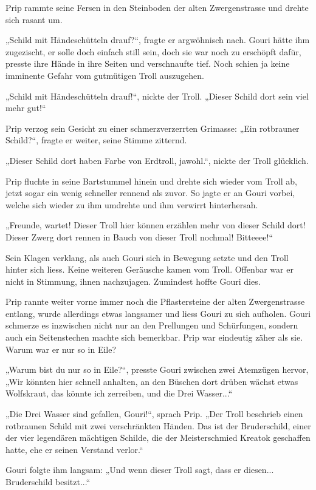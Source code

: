 Prip rammte seine Fersen in den Steinboden der alten Zwergenstrasse und drehte sich rasant um.

„Schild mit Händeschütteln drauf?“, fragte er argwöhnisch nach. Gouri hätte ihm zugezischt, er solle doch einfach still sein, doch sie war noch zu erschöpft dafür, presste ihre Hände in ihre Seiten und verschnaufte tief. Noch schien ja keine imminente Gefahr vom gutmütigen Troll auszugehen.

„Schild mit Händeschütteln drauf!“, nickte der Troll. „Dieser Schild dort sein viel mehr gut!“

Prip verzog sein Gesicht zu einer schmerzverzerrten Grimasse: „Ein rotbrauner Schild?“, fragte er weiter, seine Stimme zitternd.

„Dieser Schild dort haben Farbe von Erdtroll, jawohl.“, nickte der Troll glücklich.

Prip fluchte in seine Bartstummel hinein und drehte sich wieder vom Troll ab, jetzt sogar ein wenig schneller rennend als zuvor. So jagte er an Gouri vorbei, welche sich wieder zu ihm umdrehte und ihm verwirrt hinterhersah.

„Freunde, wartet! Dieser Troll hier können erzählen mehr von dieser Schild dort! Dieser Zwerg dort rennen in Bauch von dieser Troll nochmal! Bitteeee!“

Sein Klagen verklang, als auch Gouri sich in Bewegung setzte und den Troll hinter sich liess. Keine weiteren Geräusche kamen vom Troll. Offenbar war er nicht in Stimmung, ihnen nachzujagen. Zumindest hoffte Gouri dies.

Prip rannte weiter vorne immer noch die Pflastersteine der alten Zwergenstrasse entlang, wurde allerdings etwas langsamer und liess Gouri zu sich aufholen. Gouri schmerze es inzwischen nicht nur an den Prellungen und Schürfungen, sondern auch ein Seitenstechen machte sich bemerkbar. Prip war eindeutig zäher als sie. Warum war er nur so in Eile?

„Warum bist du nur so in Eile?“, presste Gouri zwischen zwei Atemzügen hervor, „Wir könnten hier schnell anhalten, an den Büschen dort drüben wächst etwas Wolfskraut, das könnte ich zerreiben, und die Drei Wasser...“

„Die Drei Wasser sind gefallen, Gouri!“, sprach Prip. „Der Troll beschrieb einen rotbraunen Schild mit zwei verschränkten Händen. Das ist der Bruderschild, einer der vier legendären mächtigen Schilde, die der Meisterschmied Kreatok geschaffen hatte, ehe er seinen Verstand verlor.“

Gouri folgte ihm langsam: „Und wenn dieser Troll sagt, dass er diesen... Bruderschild besitzt...“

